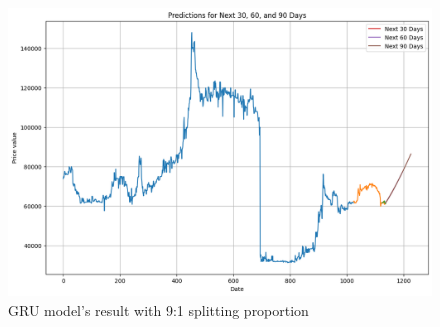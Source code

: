 \documentclass{ieeeojies}
\begin{document}
\begin{figure}[H]
  \centering
  \begin{minipage}{0.8\linewidth}
    \centering
    \includegraphics[width=\linewidth]{bibliography/Figure/DP3_GRU.png}
    \caption{GRU model's result with 9:1 splitting proportion}
    \label{fig8}
  \end{minipage}
\end{figure}
\end{document}
